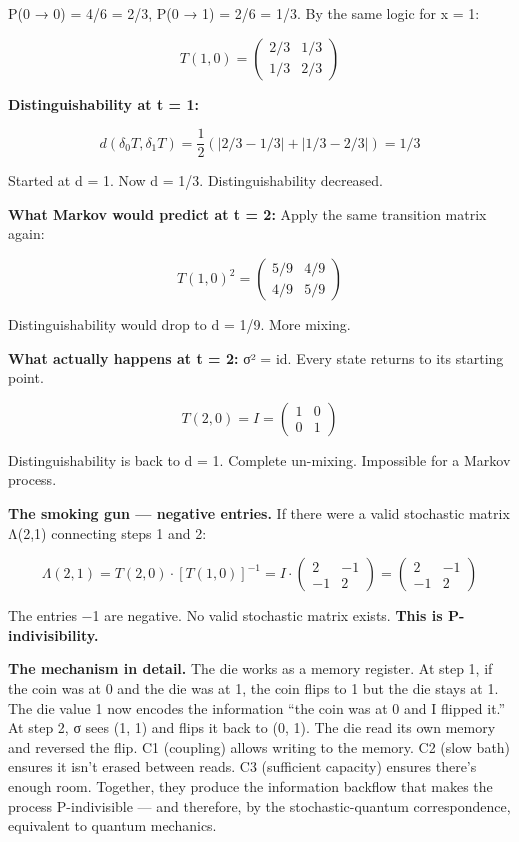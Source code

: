 \documentclass[
]{article}
\begin{document}
P(0 → 0) = 4/6 = 2/3, P(0 → 1) = 2/6 = 1/3. By the same logic for x = 1:

\[T(1,0) = \begin{pmatrix} 2/3 & 1/3 \\ 1/3 & 2/3 \end{pmatrix}\]

\textbf{Distinguishability at t = 1:}

\[d(\delta_0 T, \delta_1 T) = \frac{1}{2}(|2/3 - 1/3| + |1/3 - 2/3|) = 1/3\]

Started at d = 1. Now d = 1/3. Distinguishability decreased.

\textbf{What Markov would predict at t = 2:} Apply the same transition
matrix again:

\[T(1,0)^2 = \begin{pmatrix} 5/9 & 4/9 \\ 4/9 & 5/9 \end{pmatrix}\]

Distinguishability would drop to d = 1/9. More mixing.

\textbf{What actually happens at t = 2:} σ² = id. Every state returns to
its starting point.

\[T(2,0) = I = \begin{pmatrix} 1 & 0 \\ 0 & 1 \end{pmatrix}\]

Distinguishability is back to d = 1. Complete un-mixing. Impossible for
a Markov process.

\textbf{The smoking gun --- negative entries.} If there were a valid
stochastic matrix Λ(2,1) connecting steps 1 and 2:

\[\Lambda(2,1) = T(2,0) \cdot [T(1,0)]^{-1} = I \cdot \begin{pmatrix} 2 & -1 \\ -1 & 2 \end{pmatrix} = \begin{pmatrix} 2 & -1 \\ -1 & 2 \end{pmatrix}\]

The entries −1 are negative. No valid stochastic matrix exists.
\textbf{This is P-indivisibility.}

\textbf{The mechanism in detail.} The die works as a memory register. At
step 1, if the coin was at 0 and the die was at 1, the coin flips to 1
but the die stays at 1. The die value 1 now encodes the information
``the coin was at 0 and I flipped it.'' At step 2, σ sees (1, 1) and
flips it back to (0, 1). The die read its own memory and reversed the
flip. C1 (coupling) allows writing to the memory. C2 (slow bath) ensures
it isn't erased between reads. C3 (sufficient capacity) ensures there's
enough room. Together, they produce the information backflow that makes
the process P-indivisible --- and therefore, by the stochastic-quantum
correspondence, equivalent to quantum mechanics.
\end{document}
